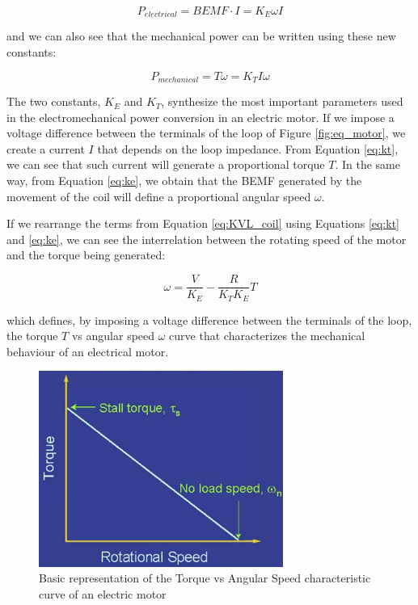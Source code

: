 \begin{equation}
	\label{eq:p_elec_2}
	P_{electrical} = BEMF\cdot I = K_{E} \omega I
\end{equation}

and we can also see that the mechanical power can be written using these new constants:

\begin{equation}
	\label{eq:p_mech_2}
	P_{mechanical} = T \omega = K_{T} I \omega
\end{equation}

The two constants, $K_{E}$ and $K_{T}$, synthesize the most important parameters used in the electromechanical power conversion in an electric motor. If we impose a voltage difference between the terminals of the loop of Figure \ref{fig:eq_motor}, we create a current $I$ that depends on the loop impedance. From Equation \ref{eq:kt}, we can see that such current will generate a proportional torque $T$. In the same way, from Equation \ref{eq:ke}, we obtain that the \ac{BEMF} generated by the movement of the coil will define a proportional angular speed $\omega$.

If we rearrange the terms from Equation \ref{eq:KVL_coil} using Equations \ref{eq:kt} and \ref{eq:ke}, we can see the interrelation between the rotating speed of the motor and the torque being generated:

\begin{equation}
	\label{eq:speed_1}
	\omega = \frac{V}{K_{E}} - \frac{R}{K_{T}K_{E}}T
\end{equation}

which defines, by imposing a voltage difference between the terminals of the loop, the torque $T$ vs angular speed $\omega$ curve that characterizes the mechanical behaviour of an electrical motor.

\begin{figure}[htbp]
\centering
\includegraphics[width=8cm]{Images/torque_speed.png} 
\caption[Torque-Speed Curve]{Basic representation of the Torque vs Angular Speed characteristic curve of an electric motor}
\label{fig:torque_speed}
\end{figure}

